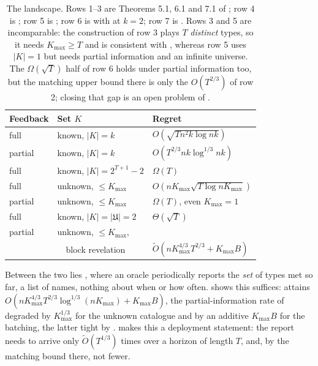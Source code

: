 \documentclass[letterpaper,9pt,twocolumn]{extarticle}
\newcommand{\Kmax}{K_{\max}}
\newcommand{\Univ}{\mathfrak{U}}
\theoremstyle{plain}
\theoremstyle{definition}
\theoremstyle{remark}
\begin{document}
\begin{table}[t]
\centering
\footnotesize
\renewcommand{\arraystretch}{1.2}
\begin{tabular}{@{}lll@{}}
\toprule
Feedback & Set $K$ & Regret\\
\midrule
full    & known, $|K|=k$        & $O(\sqrt{Tn^2k\log nk})$\\
partial & known, $|K|=k$        & $O(T^{2/3}nk\log^{1/3}\!nk)$\\
full    & known, $|K|=2^{T+1}{-}2$ & $\Omega(T)$\\
full    & unknown, $\le\Kmax$   & $O(n\Kmax\sqrt{T\log n\Kmax})$\\
partial & unknown, $\le\Kmax$   & $\Omega(T)$, even $\Kmax{=}1$\\
full    & known, $|K|{=}|\Univ|{=}2$ & $\Theta(\sqrt T)$\\
partial & unknown, $\le\Kmax$,  & \\
        & \ \ block revelation  & $\tilde O(n\Kmax^{4/3}T^{2/3}{+}\Kmax B)$\\
\bottomrule
\end{tabular}
\caption{The landscape. Rows 1--3 are
Theorems 5.1, 6.1 and 7.1 of \citet{balcan2015}; row 4 is ;
row 5 is ; row 6 is  with
 at $k=2$; row 7 is .
Rows 3 and 5 are incomparable: the construction of row 3 plays $T$
\emph{distinct} types, so it needs $\Kmax\ge T$ and is consistent with
, whereas row 5 uses $|K|=1$ but needs partial information and
an infinite universe. The $\Omega(\sqrt T)$ half of row 6 holds under partial
information too, but the matching upper bound there is only the $O(T^{2/3})$
of row 2; closing that gap is an open problem of .}
\label{tab:landscape}
\end{table}

Between the two lies , where an oracle periodically reports
the \emph{set} of types met so far, a list of names, nothing about when or
how often.  shows this suffices:  attains
$O(n\Kmax^{4/3}T^{2/3}\log^{1/3}(n\Kmax)+\Kmax B)$, the partial-information
rate of \citet[Theorem 6.1]{balcan2015} degraded by $\Kmax^{1/3}$ for the
unknown catalogue and by an additive $\Kmax B$ for the batching, the latter
tight by .  makes this a deployment statement:
the report needs to arrive only $\tilde O(T^{1/3})$ times over a horizon of
length $T$, and, by the matching bound there, not fewer.
\end{document}

